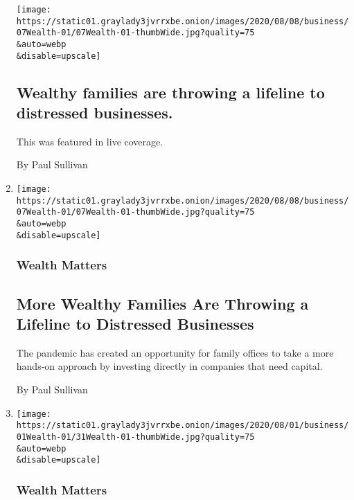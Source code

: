 \begin{enumerate}
  \texttt{[image: https://static01.graylady3jvrrxbe.onion/images/2020/08/08/business/07Wealth-01/07Wealth-01-thumbWide.jpg?quality=75\\\&auto=webp\\\&disable=upscale]}

  \hypertarget{wealthy-families-are-throwing-a-lifeline-to-distressed-businesses}{%
  \subsection{Wealthy families are throwing a lifeline to distressed
  businesses.}\label{wealthy-families-are-throwing-a-lifeline-to-distressed-businesses}}

  This was featured in live coverage.

  By Paul Sullivan
\item
  \href{/2020/08/07/your-money/family-office-direct-investment.html}{}

  \texttt{[image: https://static01.graylady3jvrrxbe.onion/images/2020/08/08/business/07Wealth-01/07Wealth-01-thumbWide.jpg?quality=75\\\&auto=webp\\\&disable=upscale]}

  \hypertarget{wealth-matters-1}{%
  \subsubsection{Wealth Matters}\label{wealth-matters-1}}

  \hypertarget{more-wealthy-families-are-throwing-a-lifeline-to-distressed-businesses}{%
  \subsection{More Wealthy Families Are Throwing a Lifeline to
  Distressed
  Businesses}\label{more-wealthy-families-are-throwing-a-lifeline-to-distressed-businesses}}

  The pandemic has created an opportunity for family offices to take a
  more hands-on approach by investing directly in companies that need
  capital.

  By Paul Sullivan
\item
  \href{/2020/07/31/your-money/birkin-bag-racehorse-invest.html}{}

  \texttt{[image: https://static01.graylady3jvrrxbe.onion/images/2020/08/01/business/01Wealth-01/31Wealth-01-thumbWide.jpg?quality=75\\\&auto=webp\\\&disable=upscale]}

  \hypertarget{wealth-matters-2}{%
  \subsubsection{Wealth Matters}\label{wealth-matters-2}}


\end{enumerate}
